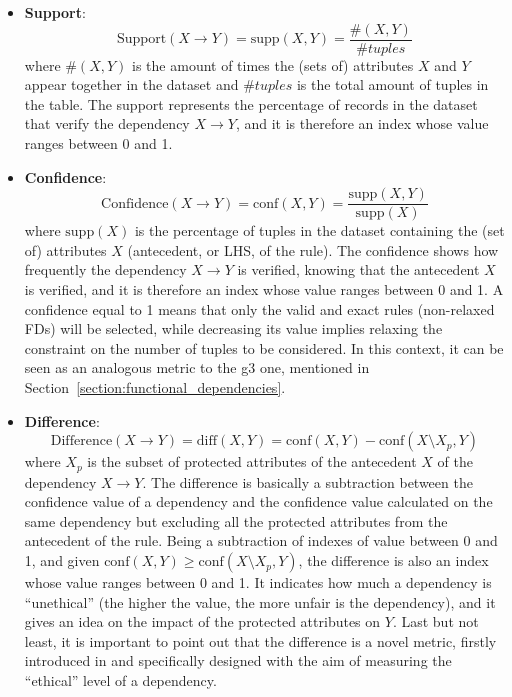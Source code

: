 \begin{itemize}
\item \textbf{Support}: \[\mathrm{Support}(X \rightarrow Y) = \mathrm{supp}(X, Y) = \frac{\#(X, Y)}{\mathit{\#tuples}}\] where \(\#(X, Y)\) is the amount of times the (sets of) attributes \(X\) and \(Y\) appear together in the dataset and \(\#tuples\) is the total amount of tuples in the table. The support represents the percentage of records in the dataset that verify the dependency \(X \rightarrow Y\), and it is therefore an index whose value ranges between 0 and 1.
\item \textbf{Confidence}: \[\mathrm{Confidence}(X \rightarrow Y) = \mathrm{conf}(X, Y) = \frac{\mathrm{supp}(X, Y)}{\mathrm{supp}(X)}\] where \(\mathrm{supp}(X)\) is the percentage of tuples in the dataset containing the (set of) attributes \(X\) (antecedent, or LHS, of the rule). The confidence shows how frequently the dependency \(X \rightarrow Y\) is verified, knowing that the antecedent \(X\) is verified, and it is therefore an index whose value ranges between 0 and 1. A confidence equal to 1 means that only the valid and exact rules (non-relaxed FDs) will be selected, while decreasing its value implies relaxing the constraint on the number of tuples to be considered. In this context, it can be seen as an analogous metric to the g3 one, mentioned in Section~\ref{section:functional_dependencies}.
\item \textbf{Difference}: \[\mathrm{Difference}(X \rightarrow Y) = \mathrm{diff}(X, Y) = \mathrm{conf}(X, Y) - \mathrm{conf}(X \setminus X_p, Y)\] where \(X_p\) is the subset of protected attributes of the antecedent \(X\) of the dependency \(X \rightarrow Y\). The difference is basically a subtraction between the confidence value of a dependency and the confidence value calculated on the same dependency but excluding all the protected attributes from the antecedent of the rule. Being a subtraction of indexes of value between 0 and 1, and given \(\mathrm{conf}(X, Y) \geq \mathrm{conf}(X \setminus X_p, Y)\), the difference is also an index whose value ranges between 0 and 1. It indicates how much a dependency is ``unethical'' (the higher the value, the more unfair is the dependency), and it gives an idea on the impact of the protected attributes on \(Y\). Last but not least, it is important to point out that the difference is a novel metric, firstly introduced in \cite{azzalini2021fair} and specifically designed with the aim of measuring the ``ethical'' level of a dependency.
\end{itemize}


